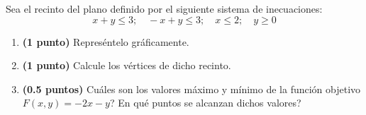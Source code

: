 
Sea el recinto del plano definido por el siguiente sistema de inecuaciones:
\[
x+y\leq3;\quad-x+y\leq3;\quad x\leq2;\quad y\geq0
\]
\begin{enumerate}[label=\alph*)]
\item \textbf{(1 punto)} Represéntelo gráficamente.
\item \textbf{(1 punto)} Calcule los vértices de dicho recinto.
\item \textbf{(0.5 puntos)} \textquestiondown{}Cuáles son los valores máximo y mínimo de la función objetivo $F(x,y)=-2x-y$? \textquestiondown{}En qué puntos se alcanzan dichos valores?
\end{enumerate}
